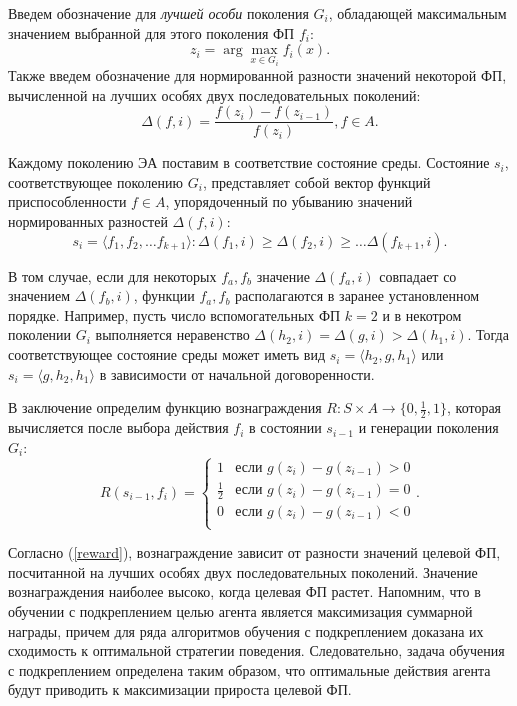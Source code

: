 Введем обозначение для \emph{лучшей особи} поколения $G_i$, обладающей максимальным значением выбранной для этого поколения ФП $f_i$: 
$$z_i = \arg \max_{x \in G_i}{f_i(x)}.$$
Также введем обозначение для нормированной разности значений некоторой ФП, вычисленной на лучших особях двух последовательных поколений:
$$\Delta(f, i) = \frac{f(z_{i}) - f(z_{i - 1})} {f(z_{i})}, f \in A.$$

Каждому поколению ЭА поставим в соответствие состояние среды. Состояние $s_i$, соответствующее поколению $G_i$, представляет собой вектор функций приспособленности $f \in A$, упорядоченный по убыванию значений нормированных разностей $\Delta(f, i)$:
\begin{equation}\label{state}s_i = \langle f_1, f_2, \ldots f_{k + 1} \rangle: \Delta(f_1, i) \geq \Delta(f_2, i) \geq \ldots \Delta(f_{k + 1}, i).\end{equation}

В том случае, если для некоторых $f_a, f_b$ значение $\Delta(f_a, i)$ совпадает со значением $\Delta(f_b, i)$, функции $f_a, f_b$ располагаются в заранее установленном порядке. Например, пусть число вспомогательных ФП $k=2$ и в некотром поколении $G_i$ выполняется неравенство $\Delta(h_2, i) = \Delta(g, i) > \Delta(h_1, i)$. Тогда соответствующее состояние среды может иметь вид $s_i = \langle h_2, g, h_1 \rangle$ или $s_i = \langle g, h_2, h_1 \rangle$ в зависимости от начальной договоренности.

В заключение определим функцию вознаграждения $R : S \times A \rightarrow \{0, \frac{1}{2}, 1\}$, которая вычисляется после выбора действия $f_i$ в состоянии $s_{i-1}$ и генерации поколения $G_i$:
\begin{equation}
\label{reward}
 R(s_{i - 1}, f_i) =
  \begin{cases}
   1 & \text{если } g(z_{i}) - g(z_{i - 1}) > 0 \\
   \frac{1}{2} & \text{если } g(z_{i}) - g(z_{i - 1}) = 0 \\
   0 & \text{если } g(z_{i}) - g(z_{i - 1}) < 0 \\
  \end{cases}.
\end{equation}

Согласно (\ref{reward}), вознаграждение зависит от разности значений целевой ФП, посчитанной на лучших особях двух последовательных поколений. Значение вознаграждения наиболее высоко, когда целевая ФП растет. Напомним, что в обучении с подкреплением целью агента является максимизация суммарной награды, причем для ряда алгоритмов обучения с подкреплением доказана их сходимость к оптимальной стратегии поведения. Следовательно, задача обучения с подкреплением определена таким образом, что оптимальные действия агента будут приводить к максимизации прироста целевой ФП.

